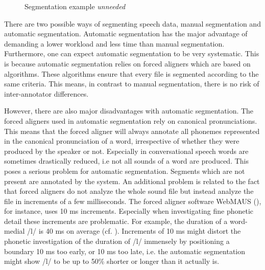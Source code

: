 \begin{figure}[]
	\centering
	\caption{Segmentation example \textit{unneeded}}
	\label{fig:segmentation unneeded}
\end{figure}

There are two possible ways of segmenting speech data, manual segmentation and automatic segmentation. Automatic segmentation has the major advantage of demanding a lower workload and less time than manual segmentation. Furthermore, one can expect automatic segmentation to be very systematic. This is because automatic segmentation relies on forced aligners which are based on algorithms. These algorithms ensure that every file is segmented according to the same criteria. This means, in contrast to manual segmentation, there is no risk of inter-annotator differences.

However, there are also major disadvantages with automatic segmentation. The forced aligners used in automatic segmentation rely on canonical pronunciations. This means that the forced aligner will always annotate all phonemes represented in the canonical pronunciation of a word, irrespective of whether they were produced by the speaker or not.  Especially in conversational speech words are sometimes drastically reduced, i.e not all sounds of a word are produced. This poses a serious problem for automatic segmentation. Segments which are not present are annotated by the system.
An additional problem is related to the fact that forced aligners do not analyze the whole sound file but instead analyze the file in increments of a few milliseconds. The forced aligner software WebMAUS (\citealt{Schiel.1999,Kisler.2016}), for instance, uses 10 ms increments. Especially when investigating fine phonetic detail these increments are problematic. For example, the duration of a word-medial /l/ is 40 ms on average (cf. \citealt{Umeda.1977}). Increments of 10 ms might distort the phonetic investigation of the duration of /l/ immensely by positioning a boundary 10 ms too early, or 10 ms too late, i.e. the automatic segmentation might show /l/ to be up to 50\% shorter or longer than it actually is.

